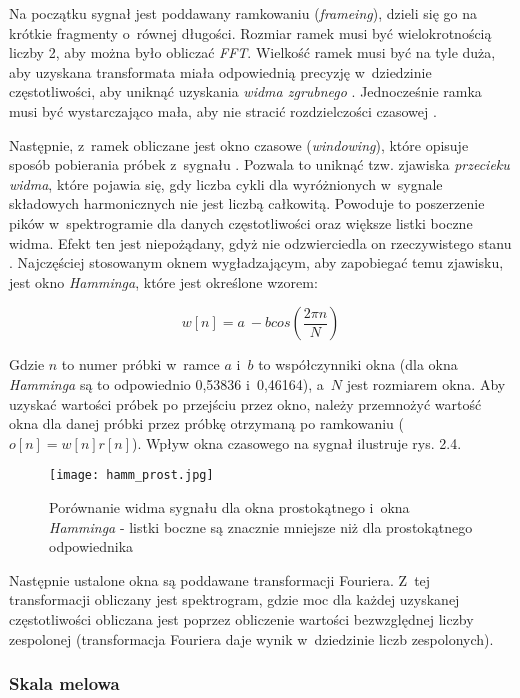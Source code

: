 Na początku sygnał jest poddawany ramkowaniu (\textit{frameing}), dzieli się go na krótkie fragmenty o~równej długości. Rozmiar ramek musi być wielokrotnością liczby 2, aby można było obliczać \textit{FFT}. Wielkość ramek musi być na tyle duża, aby uzyskana transformata miała odpowiednią precyzję w~dziedzinie częstotliwości, aby uniknąć uzyskania \textit{widma zgrubnego} \cite{Przetwarzanie}. Jednocześnie ramka musi być wystarczająco mała, aby nie stracić rozdzielczości czasowej \cite{PGFFT}.

Następnie, z~ramek obliczane jest okno czasowe (\textit{windowing}), które opisuje sposób pobierania próbek z~sygnału \cite{Wiki:FFT}. Pozwala to uniknąć tzw. zjawiska \textit{przecieku widma}, które pojawia się, gdy liczba cykli dla wyróżnionych w~sygnale składowych harmonicznych nie jest liczbą całkowitą. Powoduje to poszerzenie pików w~spektrogramie dla danych częstotliwości oraz większe listki boczne widma. Efekt ten jest niepożądany, gdyż nie odzwierciedla on rzeczywistego stanu \cite{Opolska:Przeciek}. Najczęściej stosowanym oknem wygładzającym, aby zapobiegać temu zjawisku, jest okno \textit{Hamminga}, które jest określone wzorem:

$$  w[n] = a~- b cos(\frac{2 \pi n}{N})$$


Gdzie $n$ to numer próbki w~ramce $a$ i~$b$ to współczynniki okna  (dla okna \textit{Hamminga} są to odpowiednio 0,53836 i~0,46164), a~$N$ jest rozmiarem okna. Aby uzyskać wartości próbek po przejściu przez okno, należy przemnożyć wartość okna dla danej próbki przez próbkę otrzymaną po ramkowaniu ($o[n] = w[n] r[n]$). Wpływ okna czasowego na sygnał ilustruje rys. 2.4.

\begin{figure}[h]
	\centering
	\texttt{[image: hamm\_prost.jpg]}
	\caption{Porównanie widma sygnału dla okna prostokątnego i~okna \textit{Hamminga} \cite{AGH:Okna} - listki boczne są znacznie mniejsze niż dla prostokątnego odpowiednika}
\end{figure}

Następnie ustalone okna są poddawane transformacji Fouriera. Z~tej transformacji obliczany jest spektrogram, gdzie moc dla każdej uzyskanej częstotliwości obliczana jest poprzez obliczenie wartości bezwzględnej liczby zespolonej (transformacja Fouriera daje wynik w~dziedzinie liczb zespolonych).


\subsubsection{Skala melowa}

